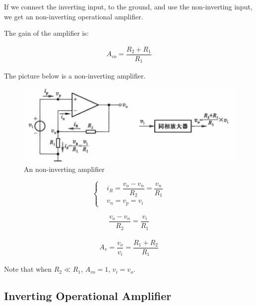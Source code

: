 If we connect the inverting input, to the ground, and use the non-inverting input, we get an non-inverting operational amplifier.

The gain of the amplifier is:

\begin{equation*}
  \begin{aligned}
    A_{vo} = \dfrac{R_2 + R_1}{R_1} 
  \end{aligned}
\end{equation*}

The picture below is a non-inverting amplifier.

\begin{figure}[H]
  \centering
  \includegraphics[width=0.9\linewidth]{figures/non-inverting-amplifier}
  \caption{An non-inverting amplifier}
  \label{fig:}
\end{figure}

\begin{equation*}
  \left\{
  \begin{aligned}
    & i_R = \dfrac{v_o - v_n}{R_2} = \dfrac{v_n}{R_1} \\
    & v_n = v_p = v_i
  \end{aligned}
  \right.
\end{equation*}

\begin{equation*}
  \begin{aligned}
    \dfrac{v_o - v_n}{R_2} = \dfrac{v_i}{R_1}  
  \end{aligned}
\end{equation*}

\begin{equation*}
  \begin{aligned}
    A_v = \dfrac{v_o}{v_i} = \dfrac{R_1 + R_2}{R_1}  
  \end{aligned}
\end{equation*}

Note that when $R_2\ll R_1$, $A_{vo} = 1$, $v_i = v_o$.

\subsection{Inverting Operational Amplifier}

